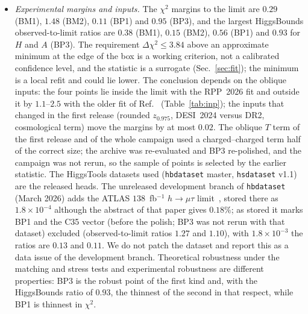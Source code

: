 \documentclass[twocolumn,epjc3]{svjour3}
\begin{document}
\begin{itemize}
\item \emph{Experimental margins and inputs.} The $\chi^2$ margins to the limit are $0.29$ (BM1), $1.48$ (BM2), $0.11$ (BP1) and $0.95$ (BP3), and the largest HiggsBounds observed-to-limit ratios are $0.38$ (BM1), $0.15$ (BM2), $0.56$ (BP1) and $0.93$ for $H$ and $A$ (BP3). The requirement $\Delta\chi^2\le3.84$ above an approximate minimum at the edge of the box is a working criterion, not a calibrated confidence level, and the statistic is a surrogate (Sec.~\ref{sec:fit}); the minimum is a local refit and could lie lower. The conclusion depends on the oblique inputs: the four points lie inside the limit with the RPP~2026 fit and outside it by $1.1$--$2.5$ with the older fit of Ref.~\cite{HerreroGarcia:2017xdq} (Table~\ref{tab:inp}); the inputs that changed in the first release (rounded $z_{0.975}$, DESI~2024 versus DR2, cosmological term) move the margins by at most $0.02$. The oblique $T$ term of the first release and of the whole campaign used a charged--charged term half of the correct size; the archive was re-evaluated and BP3 re-polished, and the campaign was not rerun, so the sample of points is selected by the earlier statistic. The HiggsTools datasets used (\texttt{hbdataset} master, \texttt{hsdataset} v1.1) are the released heads. The unreleased development branch of \texttt{hbdataset} (March 2026) adds the ATLAS $138$~fb$^{-1}$ $h\to\mu\tau$ limit~\cite{ATLAS:2023mvd}, stored there as $1.8\times10^{-4}$ although the abstract of that paper gives $0.18\%$; as stored it marks BP1 and the C35 vector (before the polish; BP3 was not rerun with that dataset) excluded (observed-to-limit ratios $1.27$ and $1.10$), with $1.8\times10^{-3}$ the ratios are $0.13$ and $0.11$. We do not patch the dataset and report this as a data issue of the development branch. Theoretical robustness under the matching and stress tests and experimental robustness are different properties: BP3 is the robust point of the first kind and, with the HiggsBounds ratio of $0.93$, the thinnest of the second in that respect, while BP1 is thinnest in $\chi^2$.

\end{itemize}
\end{document}
